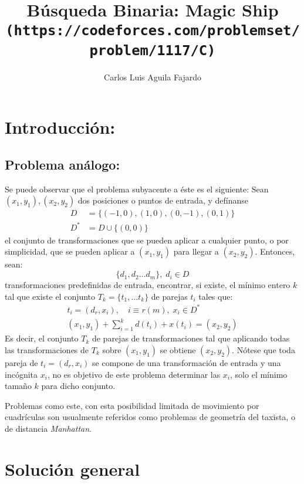\documentclass{article}
\title{
	   Búsqueda Binaria: Magic Ship\\
	   \texttt{{\large (https://codeforces.com/problemset/problem/1117/C)}}}
\author{Carlos Luis Aguila Fajardo}
\date{}
\theoremstyle{default}
\begin{document}
\maketitle

\section{Introducción:}
\subsection{Problema análogo:}
	Se puede observar que el problema subyacente a éste es el siguiente: Sean $(x_1, y_1), (x_2, y_2)$ dos posiciones o puntos de entrada, y defínanse
%
	\begin{align*}
		D &= \{ (-1,0), (1,0), (0,-1), (0,1) \}\\
		D^* &= D \cup \{(0,0)\}
	\end{align*}
%	
	el conjunto de transformaciones que se pueden aplicar a cualquier punto, o por simplicidad, que se pueden aplicar a $(x_1, y_1)$ para llegar a $(x_2, y_2)$. Entonces, sean:
%	
	\begin{equation*} 
		\{d_1, d_2 \dots d_m\},\; d_i \in D
	\end{equation*}
%	
	transformaciones predefinidas de entrada, encontrar, si existe, el mínimo entero $k$ tal que existe el conjunto $T_k = \{t_1, \dots t_k\}$ de parejas $t_i$ tales que:
%
	\begin{align}
		\label{T_1}
		t_i = (d_r, x_i),\quad i \equiv r(m), \; x_i \in D^*\\
		\label{T_2}
		(x_1,y_1) + \sum\limits_{i=1}^{k}{d(t_i) + x(t_i)} = (x_2, y_2)
	\end{align}
%
	Es decir, el conjunto $T_k$ de parejas de transformaciones tal que aplicando todas las transformaciones de $T_k$ sobre $(x_1,y_1)$ se obtiene $(x_2,y_2)$. Nótese que toda pareja de $t_i = (d_r, x_i)$ se compone de una transformación de entrada y una incógnita $x_i$, no es objetivo de este problema determinar las $x_i$, solo el mínimo tamaño $k$ para dicho conjunto.

	Problemas como este, con esta posibilidad limitada de movimiento por \\cuadrículas son usualmente referidos como problemas de geometría del taxista, o de distancia \textit{Manhattan}.
%
%
\newpage
%
%
\section{Solución general}
%
\end{document}
